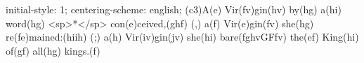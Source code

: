 initial-style: 1;
centering-scheme: english;
(c3)A(e) Vir(fv)gin(hv) by(hg) a(hi) word(hg) <sp>*</sp> con(e)ceived,(ghf) (,) a(f) Vir(e)gin(fv) she(hg) re(fe)mained:(hiih) (;) a(h) Vir(iv)gin(jv) she(hi) bare(fghvGFfv) the(ef) King(hi) of(gf) all(hg) kings.(f)
